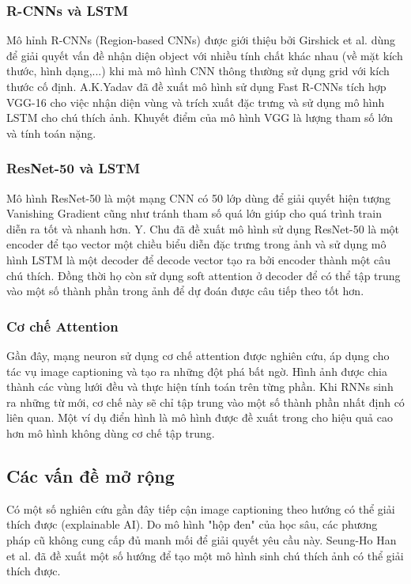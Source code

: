 \documentclass[conference]{IEEEtran}
\begin{document}
\subsubsection{R-CNNs và LSTM}
Mô hỉnh R-CNNs (Region-based CNNs) được giới thiệu bởi Girshick et al. \cite{girshick2014rich} dùng để giải quyết vấn đề nhận diện object với nhiều tính chất khác nhau (về mặt kích thước, hình dạng,...) khi mà mô hình CNN thông thường sử dụng grid với kích thước cố định. A.K.Yadav đã đề xuất mô hình sử dụng Fast R-CNNs tích hợp VGG-16 cho việc nhận diện vùng và trích xuất đặc trưng và sử dụng mô hình LSTM cho chú thích ảnh. Khuyết điểm của mô hình VGG là lượng tham số lớn và tính toán nặng.  
\subsubsection{ResNet-50 và LSTM}
Mô hình ResNet-50 là một mạng CNN có 50 lớp dùng để giải quyết hiện tượng Vanishing Gradient cũng như tránh tham số quá lớn giúp cho quá trình train diễn ra tốt và nhanh hơn.  Y. Chu \cite{chu2020automatic} đã đề xuất mô hình sử dụng ResNet-50 là một encoder để tạo vector một chiều biểu diễn đặc trưng trong ảnh và sử dụng mô hình LSTM là một decoder để decode vector tạo ra bởi encoder thành một câu chú thích. Đồng thời họ còn sử dụng soft attention ở decoder để có thể tập trung vào một số thành phần trong ảnh để dự đoán được câu tiếp theo tốt hơn. 
\subsubsection{Cơ chế Attention} 
Gần đây, mạng neuron sử dụng cơ chế attention được nghiên cứu, áp dụng cho tác vụ image captioning và tạo ra những đột phá bất ngờ.
Hình ảnh được chia thành các vùng lưới đều và thực hiện tính toán trên từng phần.
Khi RNNs sinh ra những từ mới, cơ chế này sẽ chỉ tập trung vào một số thành phần nhất định có liên quan.
Một ví dụ điển hình là mô hình được đề xuất trong \cite{yan2020image} cho hiệu quả cao hơn mô hình không dùng cơ chế tập trung.


\subsection{Các vấn đề mở rộng}
Có một số nghiên cứu gần đây tiếp cận image captioning theo hướng có thể giải thích được (explainable AI). Do mô hình "hộp đen" của học sâu, các phương pháp cũ không cung cấp đủ manh mối để giải quyết yêu cầu này. Seung-Ho Han et al. \cite{han2020explainable} đã đề xuất một số hướng để tạo một mô hình sinh chú thích ảnh có thể giải thích được.
\end{document}
